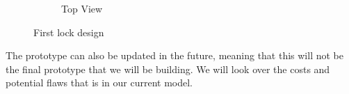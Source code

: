 \begin{figure}[htbp]
\begin{subfigure}[b]{0.48\textwidth}
        \caption{Top View}
        \label{fig:topView}
    \end{subfigure}
    \caption{First lock design}
\end{figure}

The prototype can also be updated in the future, meaning that this will not be the final prototype that we will be building. We will look over the costs and potential flaws that is in our current model.

